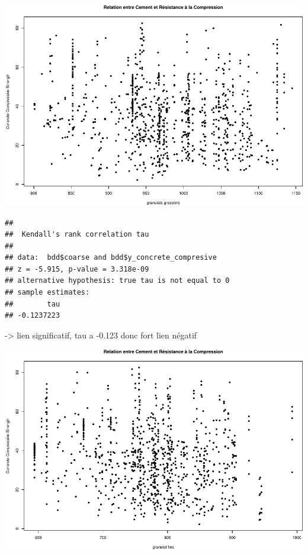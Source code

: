 \documentclass[
  12pt,
]{article}
\newenvironment{Shaded}{\begin{snugshade}}{\end{snugshade}}
\newcommand{\AttributeTok}[1]{\textcolor[rgb]{0.13,0.29,0.53}{#1}}
\newcommand{\FunctionTok}[1]{\textcolor[rgb]{0.13,0.29,0.53}{\textbf{#1}}}
\newcommand{\NormalTok}[1]{#1}
\newcommand{\SpecialCharTok}[1]{\textcolor[rgb]{0.81,0.36,0.00}{\textbf{#1}}}
\newcommand{\StringTok}[1]{\textcolor[rgb]{0.31,0.60,0.02}{#1}}
\begin{document}
\begin{center}\includegraphics{rmd_final_files/figure-latex/unnamed-chunk-13-1} \end{center}

\begin{Shaded}
\end{Shaded}

\begin{verbatim}
## 
##  Kendall's rank correlation tau
## 
## data:  bdd$coarse and bdd$y_concrete_compresive
## z = -5.915, p-value = 3.318e-09
## alternative hypothesis: true tau is not equal to 0
## sample estimates:
##        tau 
## -0.1237223
\end{verbatim}

-\textgreater{} lien significatif, tau a -0.123 donc fort lien négatif

\begin{center}\includegraphics{rmd_final_files/figure-latex/unnamed-chunk-15-1} \end{center}
\end{document}
